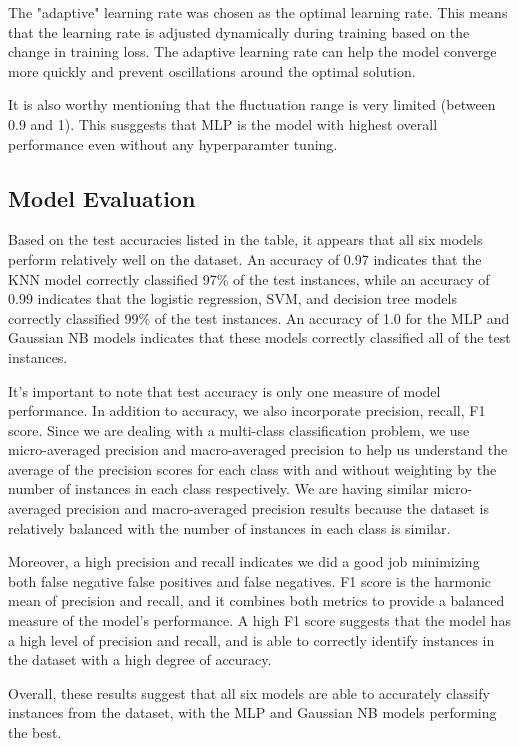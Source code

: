 \documentclass{article}
\begin{document}
The "adaptive" learning rate was chosen as the optimal learning rate. This means that the learning rate is adjusted dynamically during training based on the change in training loss. The adaptive learning rate can help the model converge more quickly and prevent oscillations around the optimal solution.

It is also worthy mentioning that the fluctuation range is very limited (between 0.9 and 1). This susggests that MLP is the model with highest overall performance even without any hyperparamter tuning.

\subsection{Model Evaluation}

Based on the test accuracies listed in the table, it appears that all six models perform relatively well on the dataset. An accuracy of 0.97 indicates that the KNN model correctly classified 97\% of the test instances, while an accuracy of 0.99 indicates that the logistic regression, SVM, and decision tree models correctly classified 99\% of the test instances. An accuracy of 1.0 for the MLP and Gaussian NB models indicates that these models correctly classified all of the test instances.

It's important to note that test accuracy is only one measure of model performance. In addition to accuracy, we also incorporate precision, recall, F1 score. Since we are dealing with a multi-class classification problem, we use micro-averaged precision and macro-averaged precision to help us understand the average of the precision scores for each class with and without weighting by the number of instances in each class respectively. We are having similar micro-averaged precision and macro-averaged precision results because the dataset is relatively balanced with the number of instances in each class is similar.

Moreover, a high precision and recall indicates we did a good job minimizing both false negative false positives and false negatives. F1 score is the harmonic mean of precision and recall, and it combines both metrics to provide a balanced measure of the model's performance. A high F1 score suggests that the model has a high level of precision and recall, and is able to correctly identify instances in the dataset with a high degree of accuracy.

Overall, these results suggest that all six models are able to accurately classify instances from the dataset, with the MLP and Gaussian NB models performing the best.
\end{document}
